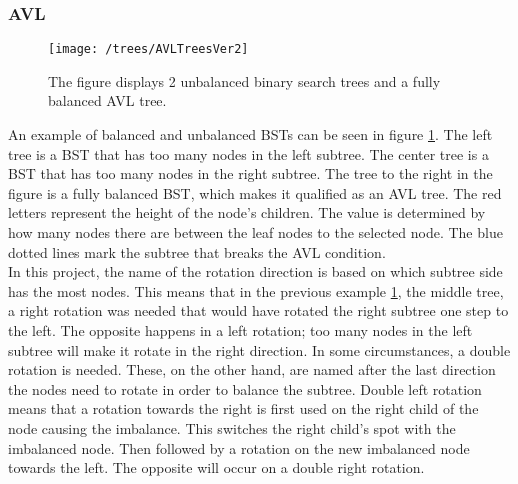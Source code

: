\subsubsection{AVL}
\begin{figure}[H]
    \centering
    \texttt{[image: /trees/AVLTreesVer2]}    
    \caption{The figure displays 2 unbalanced binary search trees and a fully balanced AVL tree. }
    \label{fig:AVLTrees}
\end{figure}
\noindent
An example of balanced and unbalanced BSTs can be seen in figure \ref{fig:AVLTrees}. The left tree is a BST that has too many nodes in the left subtree. The center tree is a BST that has too many nodes in the right subtree. The tree to the right in the figure is a fully balanced BST, which makes it qualified as an AVL tree. The red letters represent the height of the node's children. The value is determined by how many nodes there are between the leaf nodes to the selected node. The blue dotted lines mark the subtree that breaks the AVL condition.
\\[11pt]
In this project, the name of the rotation direction is based on which subtree side has the most nodes. This means that in the previous example \ref{fig:AVLTrees}, the middle tree, a right rotation was needed that would have rotated the right subtree one step to the left. The opposite happens in a left rotation; too many nodes in the left subtree will make it rotate in the right direction. In some circumstances, a double rotation is needed. These, on the other hand, are named after the last direction the nodes need to rotate in order to balance the subtree. Double left rotation means that a rotation towards the right is first used on the right child of the node causing the imbalance. This switches the right child's spot with the imbalanced node. Then followed by a rotation on the new imbalanced node towards the left. The opposite will occur on a double right rotation.
\\[11pt]
